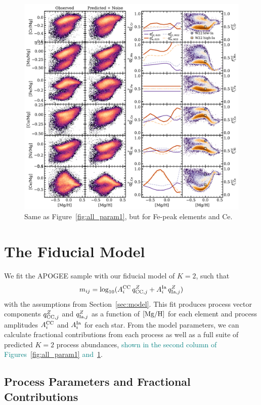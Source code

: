\documentclass[modern]{aastex631}
\newcommand{\mgh}{[{\rm Mg}/{\rm H}]}
\newcommand{\qcc}{q_{{\rm CC,}j}^{Z}}
\newcommand{\qIa}{q_{{\rm Ia,}j}^{Z}}
\newcommand{\Acc}{A^{\rm CC}_{i}}
\newcommand{\AIa}{A^{\rm Ia}_{i}}
\newcommand{\add}[1]{\textcolor{teal}{#1}}
\begin{document}
\begin{figure}[htb!]
    \centering
    \includegraphics[width=\textwidth]{Paper/Figures/all_param2.pdf}
    \caption{Same as Figure~\ref{fig:all_param1}, but for Fe-peak elements and Ce.}
    \label{fig:all_param2}
\end{figure}


\section{The Fiducial Model} \label{sec:fiducial}

We fit the APOGEE sample with our fiducial model of $K=2$, such that
\begin{equation}\label{eq:m_ij}
    m_{ij} = \log_{10}(A_i^{\rm CC} \, q_{{\rm CC},j}^Z + A_i^{\rm Ia} \, q_{{\rm Ia},j}^Z)
\end{equation}
with the assumptions from Section~\ref{sec:model}. This fit produces process vector components $\qcc$ and $\qIa$ as a function of $\mgh$ for each element and process amplitudes $\Acc$ and $\AIa$ for each star. From the model parameters, we can calculate fractional contributions from each process as well as a full suite of predicted $K=2$ process abundances, \add{shown in the second column of Figures~\ref{fig:all_param1} and~\ref{fig:all_param2}}.

\subsection{Process Parameters and Fractional Contributions} \label{subsec:parameters}
\end{document}
